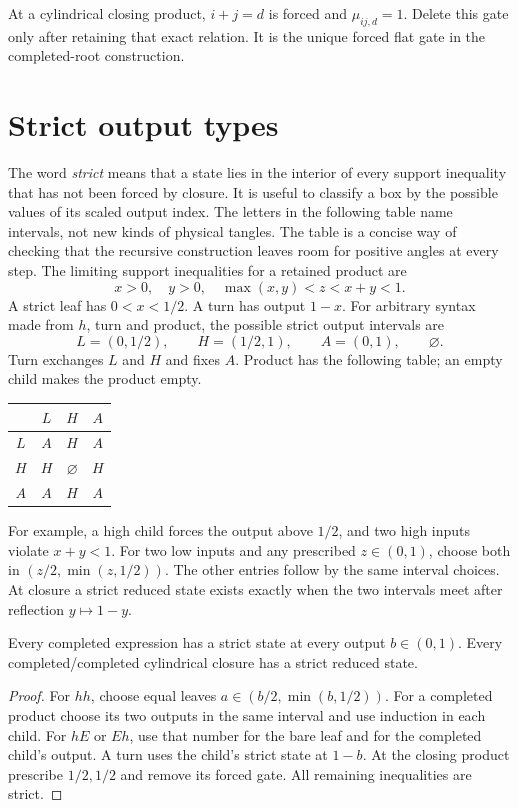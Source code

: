 At a cylindrical closing product, $i+j=d$ is forced and $\mu_{ij,d}=1$. Delete this gate only after retaining that exact relation. It is the unique forced flat gate in the completed-root construction.

\section{Strict output types}

The word \emph{strict} means that a state lies in the interior of every support inequality that has not been forced by closure. It is useful to classify a box by the possible values of its scaled output index. The letters in the following table name intervals, not new kinds of physical tangles. The table is a concise way of checking that the recursive construction leaves room for positive angles at every step.
The limiting support inequalities for a retained product are
\begin{equation}\label{eq:strict-domain}
 x>0,\quad y>0,\quad \max(x,y)<z<x+y<1.
\end{equation}
A strict leaf has $0<x<1/2$. A turn has output $1-x$. For arbitrary syntax made from $h$, turn and product, the possible strict output intervals are
\[
 L=(0,1/2),\qquad H=(1/2,1),\qquad A=(0,1),\qquad\varnothing.
\]
Turn exchanges $L$ and $H$ and fixes $A$. Product has the following table; an empty child makes the product empty.
\begin{center}
\begin{tabular}{c|ccc}
 & $L$ & $H$ & $A$\\\hline
$L$ & $A$ & $H$ & $A$\\
$H$ & $H$ & $\varnothing$ & $H$\\
$A$ & $A$ & $H$ & $A$
\end{tabular}
\end{center}
For example, a high child forces the output above $1/2$, and two high inputs violate $x+y<1$. For two low inputs and any prescribed $z\in(0,1)$, choose both in $(z/2,\min(z,1/2))$. The other entries follow by the same interval choices. At closure a strict reduced state exists exactly when the two intervals meet after reflection $y\mapsto1-y$.

\begin{lemma}\label{lem:strict-feasible}
Every completed expression has a strict state at every output $b\in(0,1)$. Every completed/completed cylindrical closure has a strict reduced state.
\end{lemma}
\begin{proof}
For $hh$, choose equal leaves $a\in(b/2,\min(b,1/2))$. For a completed product choose its two outputs in the same interval and use induction in each child. For $hE$ or $Eh$, use that number for the bare leaf and for the completed child's output. A turn uses the child's strict state at $1-b$. At the closing product prescribe $1/2,1/2$ and remove its forced gate. All remaining inequalities are strict.
\end{proof}

